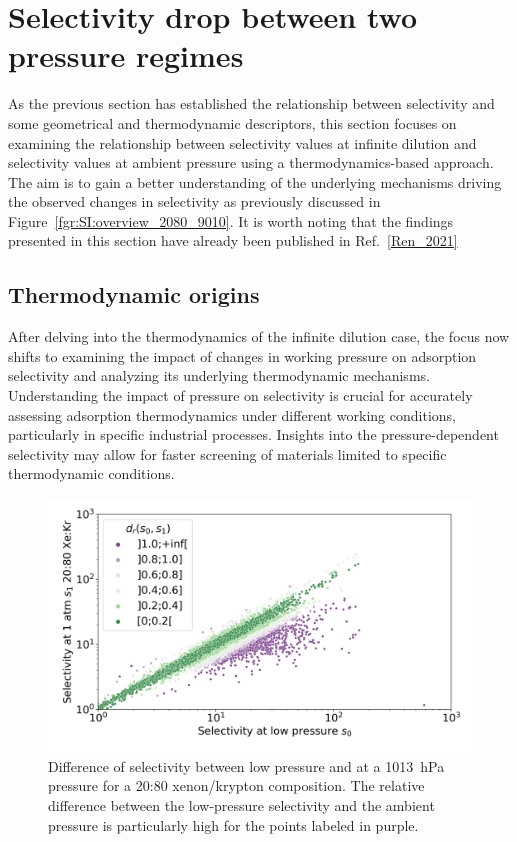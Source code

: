 \documentclass[main.tex]{subfiles}
\begin{document}
\section{Selectivity drop between two pressure regimes}

As the previous section has established the relationship between selectivity and some geometrical and thermodynamic descriptors, this section focuses on examining the relationship between selectivity values at infinite dilution and selectivity values at ambient pressure using a thermodynamics-based approach. The aim is to gain a better understanding of the underlying mechanisms driving the observed changes in selectivity as previously discussed in Figure~\ref{fgr:SI:overview_2080_9010}. It is worth noting that the findings presented in this section have already been published in Ref.~\ref{Ren_2021}

\subsection{Thermodynamic origins}\label{section:pressure}

After delving into the thermodynamics of the infinite dilution case, the focus now shifts to examining the impact of changes in working pressure on adsorption selectivity and analyzing its underlying thermodynamic mechanisms. Understanding the impact of pressure on selectivity is crucial for accurately assessing adsorption thermodynamics under different working conditions, particularly in specific industrial processes. Insights into the pressure-dependent selectivity may allow for faster screening of materials limited to specific thermodynamic conditions.
\begin{figure}[ht]
  \centering
    \includegraphics[width=0.6\linewidth]{figures/2-thermo/s_0_vs_s_2080_overview_log.jpg}
    \caption{Difference of selectivity between low pressure and at a \SI{1013}{\hecto\pascal} pressure for a 20:80 xenon/krypton composition. The relative difference between the low-pressure selectivity and the ambient pressure is particularly high for the points labeled in purple.}\label{fgr:overview}
\end{figure}
\end{document}
